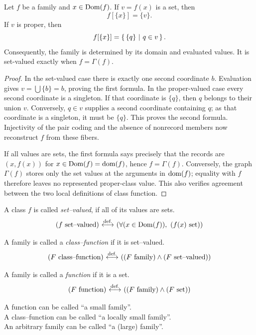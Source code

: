 \begin{lemma}
Let $f$ be a family and $x\in\mathrm{Dom}(f)$. If $v=f(x)$ is a set, then
\[
f[\{x\}]=\{v\}.
\]
If $v$ is proper, then
\[
f[\{x\}]=\left\{\,\{q\}\ \middle|\ q\in v\,\right\}.
\]
Consequently, the family is determined by its domain and evaluated values.
It is set-valued exactly when $f=\Gamma(f)$.
\end{lemma}
\begin{proof}
In the set-valued case there is exactly one second coordinate $b$.
Evaluation gives $v=\bigcup\{b\}=b$, proving the first formula.
In the proper-valued case every second coordinate is a singleton.
If that coordinate is $\{q\}$, then $q$ belongs to their union $v$.
Conversely, $q\in v$ supplies a second coordinate containing $q$;
as that coordinate is a singleton, it must be $\{q\}$. This proves
the second formula. Injectivity of the pair coding and the absence of
nonrecord members now reconstruct $f$ from these fibers.

If all values are sets, the first formula says precisely that the records
are $(x,f(x))$ for $x\in\mathrm{Dom}(f)=\mathrm{dom}(f)$, hence $f=\Gamma(f)$.
Conversely, the graph $\Gamma(f)$ stores only the set values at the
arguments in $\mathrm{dom}(f)$; equality with $f$ therefore leaves no represented
proper-class value. This also verifies agreement between the two local
definitions of class function.
\end{proof}
\begin{definition}
A class $f$ is called \textit{set--valued}, if all of its values are sets.
\[
(f\text{ set--valued})\ {\stackrel{{\textrm{def.}}}{\longleftrightarrow}}\ (\forall (x\in\mathrm{Dom}(f)),\ (f(x)\text{ set}))
\]
\end{definition}
\begin{definition}
A family is called a \textit{class--function} if it is set--valued.
\[
(F\text{ class--function})\ {\stackrel{{\textrm{def.}}}{\longleftrightarrow}}\ ((F\text{ family})\land(F\text{ set--valued}))
\]
\end{definition}
\begin{definition}[function]
A family is called a \textit{function} if it is a set.
\[
(F\text{ function})\ {\stackrel{{\textrm{def.}}}{\longleftrightarrow}}\ ((F\text{ family})\land(F\text{ set}))
\]
\end{definition}
\begin{note}
A function can be called ``a small family''.\\
A class--function can be called ``a locally small family''.\\
An arbitrary family can be called ``a (large) family''.
\end{note}

